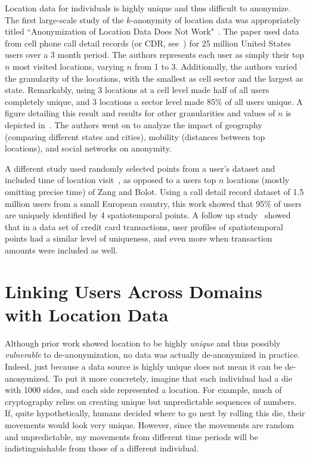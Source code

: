 Location data for individuals is highly unique and thus difficult to anonymize.
The first large-scale study of the $k$-anonymity of location data was appropriately titled ``Anonymization of Location Data Does Not Work"~\cite{Zang:2011hk}.
The paper used data from cell phone call detail records (or CDR, see~) for 25 million United States users over a 3 month period.
The authors represents each user as simply their top $n$ most visited locations, varying $n$ from 1 to 3.
Additionally, the authors varied the granularity of the locations, with the smallest as cell sector and the largest as state.
Remarkably, using 3 locations at a cell level made half of all users completely unique, and 3 locations a sector level made 85\% of all users unique.
A figure detailing this result and results for other granularities and values of $n$ is depicted in~.
The authors went on to analyze the impact of geography (comparing different states and cities), mobility (distances between top locations), and social networks on anonymity.

A different study used randomly selected points from a user's dataset and included time of location visit~\cite{de2013unique}, as opposed to a users top $n$ locations (mostly omitting precise time) of Zang and Bolot.
Using a call detail record dataset of 1.5 million users from a small European country, this work showed that 95\% of users are uniquely identified by 4 spatiotemporal points.
A follow up study~\cite{de2015unique} showed that in a data set of credit card transactions, user profiles of spatiotemporal points had a similar level of uniqueness, and even more when transaction amounts were included as well.


\section{Linking Users Across Domains with Location Data}
Although prior work showed location to be highly \emph{unique} and thus possibly \emph{vulnerable} to de-anonymization, no data was actually de-anonymized in practice.
Indeed, just because a data source is highly unique does not mean it can be de-anonymized.
To put it more concretely, imagine that each individual had a die with 1000 sides, and each side represented a location.
For example, much of cryptography relies on creating unique but unpredictable sequences of numbers.
If, quite hypothetically, humans decided where to go next by rolling this die, their movements would look very unique.
However, since the movements are random and unpredictable, my movements from different time periods will be indistinguishable from those of a different individual.

